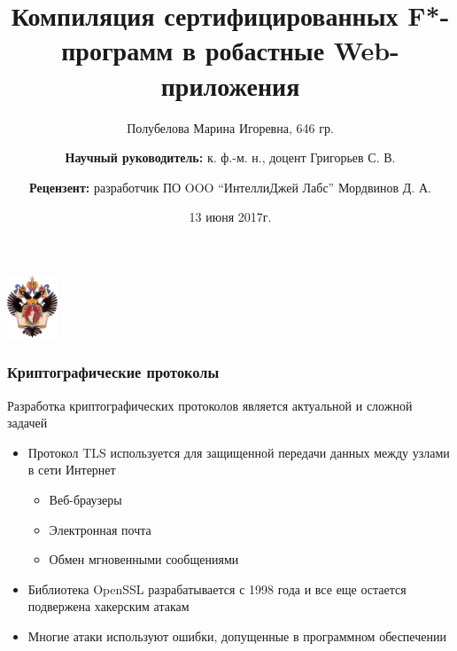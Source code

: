 \documentclass{beamer}
\title[]{Компиляция сертифицированных F*-программ в робастные Web-приложения}
\institute[СПбГУ]{
Санкт-Петербургский государственный университет \\

Кафедра системного программирования }
\author[Полубелова Марина]{Полубелова Марина Игоревна, 646 гр. \\
  \and  
  {\bfseries Научный руководитель:} к. ф.-м. н., доцент Григорьев С. В. \\
    \and
    {\bfseries Рецензент:} разработчик ПО OOO “ИнтеллиДжей Лабс” Мордвинов Д. А.}
\date{13 июня 2017г.}
\begin{document}
\begin{frame}
    \begin{center}
        {\includegraphics[width=1.5cm]{SPbGU_Logo.png}}
    \end{center}
    \titlepage
\end{frame}


\begin{frame}
\transwipe[direction=90]
\frametitle{Криптографические протоколы}

Разработка криптографических протоколов является актуальной и сложной задачей

\begin{itemize}
\item Протокол TLS используется для защищенной передачи данных между узлами в сети Интернет
	\begin{itemize}
	\item Веб-браузеры
	\item Электронная почта
	\item Обмен мгновенными сообщениями
	\end{itemize}
\item Библиотека OpenSSL разрабатывается с 1998 года и все еще остается подвержена хакерским атакам
\item Многие атаки используют ошибки, допущенные в программном обеспечении
\end{itemize}

\end{frame}
\end{document}
